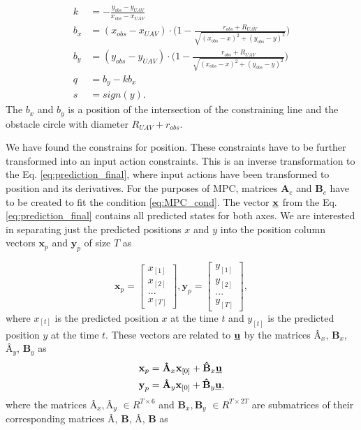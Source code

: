 \documentclass[a4paper,11pt,titlepage]{article}
\newcommand{\uvec}{\textbf{\underline{u}}}
\begin{document}
\begin{equation}
\label{eq:obstacle_constants}
\begin{split}
k &= -\frac{y_{obs} - y_{UAV}}{x_{obs} - x_{UAV}}\\
b_x &= (x_{obs}-x_{UAV})\cdot \big(1-\frac{r_{obs}+R_{UAV}}{\sqrt{(x_{obs} - x)^2 + (y_{obs} - y)^2}} \big)\\
b_y &= (y_{obs}-y_{UAV})\cdot \big(1-\frac{r_{obs}+R_{UAV}}{\sqrt{(x_{obs} - x)^2 + (y_{obs} - y)^2}} \big)\\
q &= b_y - kb_x\\
s &= sign(y).
\end{split}
\end{equation}
The $b_x$ and $b_y$ is a position of the intersection of the constraining line and the obstacle circle with diameter $R_{UAV}+r_{obs}$. 

We have found the constrains for position. These constraints have to be further transformed into an input action constraints. This is an inverse transformation to the Eq. \ref{eq:prediction_final}, where input actions have been transformed to position and its derivatives. For the purposes of MPC, matrices $\textbf{A}_c $ and $\textbf{B}_c$ have to be created to fit the condition \ref{eq:MPC_cond}. The vector $\textbf{\underline{x}}$ from the Eq. \ref{eq:prediction_final} contains all predicted states for both axes. We are interested in separating just the predicted positions $x$ and $y$ into the position column vectors $\textbf{x}_p$ and $\textbf{y}_p$ of size $T$ as 

\begin{equation}
\textbf{x}_p =
  \begin{bmatrix}
  x_{[1]} \\
  x_{[2]} \\
  ...	   \\
  x_{[T]}
  \end{bmatrix},\textbf{y}_p = \begin{bmatrix}
  y_{[1]} \\
  y_{[2]} \\
  ...	   \\
  y_{[T]}
  \end{bmatrix},
\end{equation}
where $x_{[t]}$ is the predicted position $x$ at the time $t$ and $y_{[t]}$ is the predicted position $y$ at the time $t$.
These vectors are related to $\uvec$ by the matrices $\textbf{\^A}_x$, $\textbf{\^B}_x$, $\textbf{\^A}_y$, $\textbf{\^B}_y$ as
\begin{equation}
\label{eq:pos_matrixes}
\begin{split}
\textbf{x}_p &= \textbf{\^A}_x \textbf{x}_{[0]} + \textbf{\^B}_x \uvec \\
\textbf{y}_p &= \textbf{\^A}_y \textbf{x}_{[0]} + \textbf{\^B}_y \uvec, \\
\end{split}
\end{equation}
where the matrices $\textbf{\^A}_x, \textbf{\^A}_y$ $\in R^{T \times 6}$ and $\textbf{\^B}_x, \textbf{\^B}_y$ $\in R^{T \times 2T}$ are submatrices of their corresponding matrices  $\textbf{\^A}$, $\textbf{\^B}$, $\textbf{\^A}$, $\textbf{\^B}$ as 
\end{document}
